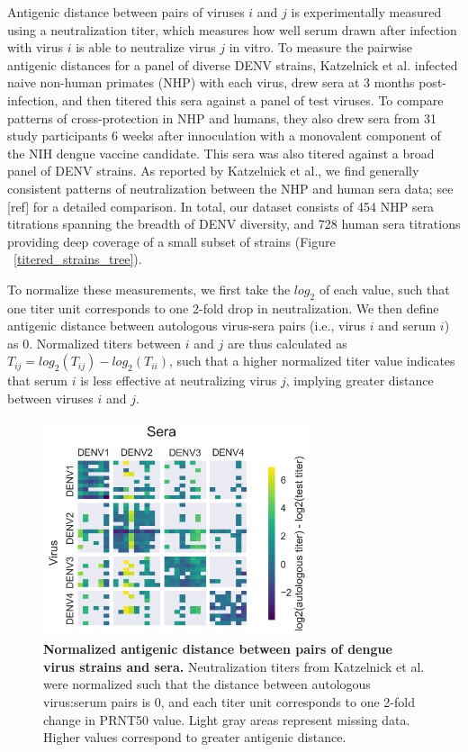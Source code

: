 \documentclass[11pt,oneside,letterpaper]{article}
\begin{document}
Antigenic distance between pairs of viruses $i$ and $j$ is experimentally measured using a neutralization titer, which measures how well serum drawn after infection with virus $i$ is able to neutralize virus $j$ in vitro.
To measure the pairwise antigenic distances for a panel of diverse DENV strains, Katzelnick et al. infected naive non-human primates (NHP) with each virus, drew sera at 3 months post-infection, and then titered this sera against a panel of test viruses.
To compare patterns of cross-protection in NHP and humans, they also drew sera from 31 study participants 6 weeks after innoculation with a monovalent component of the NIH dengue vaccine candidate.
This sera was also titered against a broad panel of DENV strains.
As reported by Katzelnick et al., we find generally consistent patterns of neutralization between the NHP and human sera data; see [ref] for a detailed comparison.
In total, our dataset consists of 454 NHP sera titrations spanning the breadth of DENV diversity, and 728 human sera titrations providing deep coverage of a small subset of strains (Figure ~\ref{titered_strains_tree}).

To normalize these measurements, we first take the $log_2$ of each value, such that one titer unit corresponds to one 2-fold drop in neutralization.
We then define antigenic distance between autologous virus-sera pairs (i.e., virus $i$ and serum $i$) as 0.
Normalized titers between $i$ and $j$ are thus calculated as $T_{ij} = log_2(T_{ij}) - log_2(T_{ii})$, such that a higher normalized titer value indicates that serum $i$ is less effective at neutralizing virus $j$, implying greater distance between viruses $i$ and $j$.

\begin{figure}[h]
\begin{centering}
\includegraphics[width=0.7\textwidth]{../figures/png/titer_heatmap.png}
    \caption{\textbf{Normalized antigenic distance between pairs of dengue virus strains and sera.} Neutralization titers from Katzelnick et al. were normalized such that the distance between autologous virus:serum pairs is 0, and each titer unit corresponds to one 2-fold change in PRNT50 value. Light gray areas represent missing data. Higher values correspond to greater antigenic distance.}
     \label{titer_heatmap}
\end{centering}
\end{figure}
\end{document}

